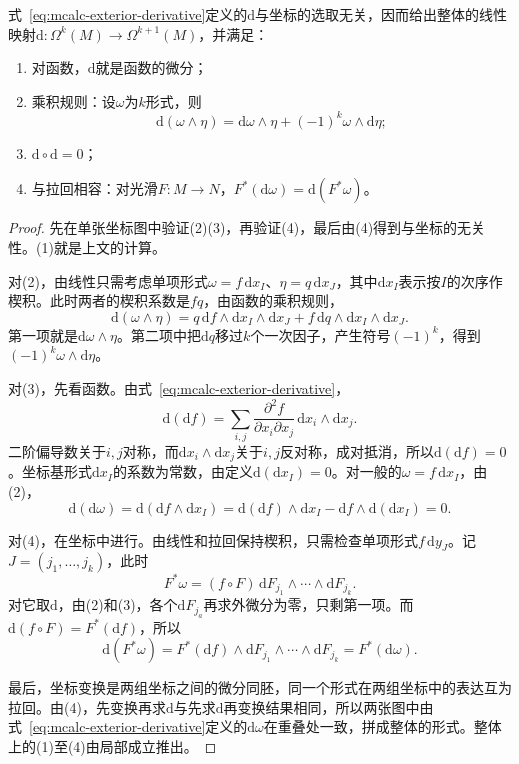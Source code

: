 \begin{theorem}[外微分的性质]
\label{thm:mcalc-exterior-derivative}
式~\eqref{eq:mcalc-exterior-derivative}定义的$\mathrm d$与坐标的选取无关，因而给出整体的线性映射$\mathrm d:\Omega^k(M)\to\Omega^{k+1}(M)$，并满足：
\begin{enumerate}
\item 对函数，$\mathrm d$就是函数的微分；
\item 乘积规则：设$\omega$为$k$形式，则
\begin{equation}
\mathrm d(\omega\wedge\eta)=\mathrm d\omega\wedge\eta+(-1)^k\omega\wedge\mathrm d\eta ;
\label{eq:mcalc-d-product}
\end{equation}
\item $\mathrm d\circ\mathrm d=0$；
\item 与拉回相容：对光滑$F:M\to N$，$F^*(\mathrm d\omega)=\mathrm d(F^*\omega)$。
\end{enumerate}
\end{theorem}

\begin{proof}
先在单张坐标图中验证(2)(3)，再验证(4)，最后由(4)得到与坐标的无关性。(1)就是上文的计算。

对(2)，由线性只需考虑单项形式$\omega=f\,\mathrm dx_I$、$\eta=q\,\mathrm dx_J$，其中$\mathrm dx_I$表示按$I$的次序作楔积。此时两者的楔积系数是$fq$，由函数的乘积规则，
\[
\mathrm d(\omega\wedge\eta)=q\,\mathrm df\wedge\mathrm dx_I\wedge\mathrm dx_J+f\,\mathrm dq\wedge\mathrm dx_I\wedge\mathrm dx_J .
\]
第一项就是$\mathrm d\omega\wedge\eta$。第二项中把$\mathrm dq$移过$k$个一次因子，产生符号$(-1)^k$，得到$(-1)^k\omega\wedge\mathrm d\eta$。

对(3)，先看函数。由式~\eqref{eq:mcalc-exterior-derivative}，
\[
\mathrm d(\mathrm df)=\sum_{i,j}\frac{\partial^2f}{\partial x_i\partial x_j}\,\mathrm dx_i\wedge\mathrm dx_j .
\]
二阶偏导数关于$i,j$对称，而$\mathrm dx_i\wedge\mathrm dx_j$关于$i,j$反对称，成对抵消，所以$\mathrm d(\mathrm df)=0$。坐标基形式$\mathrm dx_I$的系数为常数，由定义$\mathrm d(\mathrm dx_I)=0$。对一般的$\omega=f\,\mathrm dx_I$，由(2)，
\[
\mathrm d(\mathrm d\omega)=\mathrm d(\mathrm df\wedge\mathrm dx_I)=\mathrm d(\mathrm df)\wedge\mathrm dx_I-\mathrm df\wedge\mathrm d(\mathrm dx_I)=0 .
\]

对(4)，在坐标中进行。由线性和拉回保持楔积，只需检查单项形式$f\,\mathrm dy_J$。记$J=(j_1,\ldots,j_k)$，此时
\[
F^*\omega=(f\circ F)\,\mathrm dF_{j_1}\wedge\cdots\wedge\mathrm dF_{j_k}.
\]
对它取$\mathrm d$，由(2)和(3)，各个$\mathrm dF_{j_a}$再求外微分为零，只剩第一项。而$\mathrm d(f\circ F)=F^*(\mathrm df)$，所以
\[
\mathrm d(F^*\omega)=F^*(\mathrm df)\wedge\mathrm dF_{j_1}\wedge\cdots\wedge\mathrm dF_{j_k}=F^*(\mathrm d\omega).
\]

最后，坐标变换是两组坐标之间的微分同胚，同一个形式在两组坐标中的表达互为拉回。由(4)，先变换再求$\mathrm d$与先求$\mathrm d$再变换结果相同，所以两张图中由式~\eqref{eq:mcalc-exterior-derivative}定义的$\mathrm d\omega$在重叠处一致，拼成整体的形式。整体上的(1)至(4)由局部成立推出。
\end{proof}

